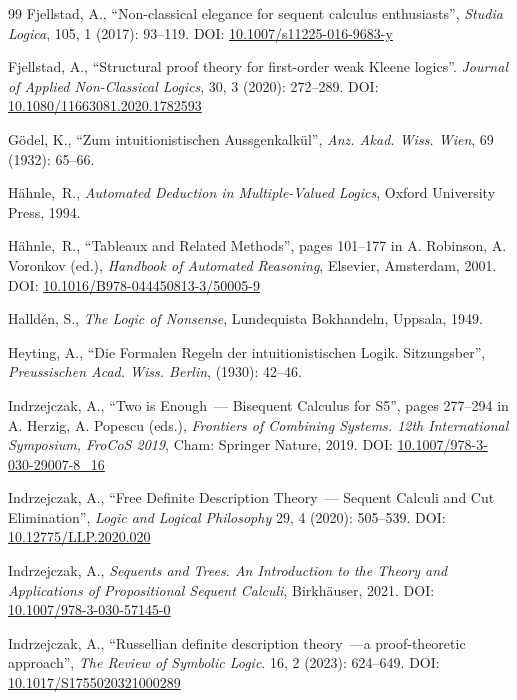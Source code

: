 \documentclass[11pt,a4paper,titlepage]{article}
\theoremstyle{definition}
\newcommand{\3}{\vspace{.3in}}
\newcommand{\2}{\vspace{.2in}}
\newcommand{\1}{\vspace{.1in}}
\newcommand{\5}{\vspace{.05in}}
\newcommand\DOI[2]{DOI: \href{#1#2}{#2}}
\begin{document}
\begin{thebibliography}{99}
Fjellstad, A., ``Non-classical elegance for sequent calculus enthusiasts'', \textit{Studia Logica}, 105, 1 (2017): 93--119. \DOI{http://dx.doi.org/}{10.1007/s11225-016-9683-y}

Fjellstad, A., ``Structural proof theory for first-order weak Kleene logics''. \textit{Journal of Applied Non-Classical Logics}, 30, 3 (2020): 272--289. \DOI{http://dx.doi.org/}{10.1080/11663081.2020.1782593}

G\"{o}del, K.,  
``Zum intuitionistischen Aussgenkalk\"{u}l'', \textit{Anz. Akad. Wiss. Wien},  69 (1932): 65--66.

H\"ahnle,~R., \textit{Automated Deduction in Multiple-Valued Logics}, Oxford University Press, 1994.

H\"ahnle,~R., ``Tableaux and Related Methods'', pages 101--177 
in A. Robinson, A. Voronkov (ed.), \textit{Handbook of Automated Reasoning}, Elsevier, Amsterdam, 2001.
\DOI{http://dx.doi.org/}{10.1016/B978-044450813-3/50005-9}


Halld\'{e}n, S., \textit{The Logic of Nonsense}, Lundequista Bokhandeln, Uppsala, 1949.


Heyting, A., 
``Die Formalen Regeln der intuitionistischen Logik. Sitzungsber'',  \textit{Preussischen Acad. Wiss. Berlin},  (1930): 42--46.

Indrzejczak, A., ``Two is Enough~--- Bisequent Calculus for S5'', pages 277--294 in A. Herzig, A. Popescu (eds.), \textit{Frontiers of Combining Systems. 12th International Symposium, FroCoS 2019}, Cham: Springer Nature, 2019.
\DOI{http://dx.doi.org/}{10.1007/978-3-030-29007-8\_16}

	Indrzejczak, A., ``Free Definite Description Theory~--- Sequent Calculi and Cut Elimination'', \textit{Logic and Logical Philosophy} 29, 4 (2020): 505--539.
\DOI{http://dx.doi.org/}{10.12775/LLP.2020.020}

Indrzejczak, A., \textit{Sequents and Trees. An Introduction to the Theory and Applications of Propositional Sequent Calculi}, Birkh\"auser, 2021.
\DOI{http://dx.doi.org/}{10.1007/978-3-030-57145-0}

	Indrzejczak, A., ``Russellian definite description theory~---{a} proof-theoretic approach'',  
	\textit{The Review of Symbolic Logic}. 16, 2 (2023): 624--649. \DOI{http://dx.doi.org/}{10.1017/S1755020321000289}



\end{thebibliography}
\end{document}
